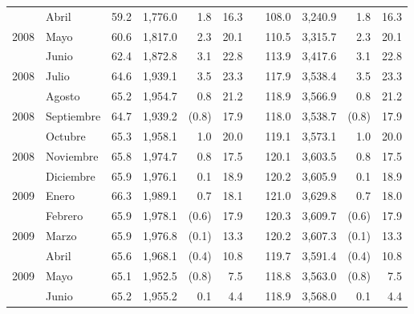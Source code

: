 \begin{center}
\begin{longtable}{llrrrrrrrrr}
		\rowcolor{color1!5!white}\multicolumn{1}{l}{	2008	}&	Abril	&	 59.2 	&	 1,776.0 	&	 1.8 	&	 16.3 	&  &	 108.0 	&	 3,240.9 	&	 1.8 	&	 16.3 	\\
		\multicolumn{1}{l}{	2008	}&	Mayo	&	 60.6 	&	 1,817.0 	&	 2.3 	&	 20.1 	&  &	 110.5 	&	 3,315.7 	&	 2.3 	&	 20.1 	\\
		\rowcolor{color1!5!white}\multicolumn{1}{l}{	2008	}&	Junio	&	 62.4 	&	 1,872.8 	&	 3.1 	&	 22.8 	&  &	 113.9 	&	 3,417.6 	&	 3.1 	&	 22.8 	\\
		\multicolumn{1}{l}{	2008	}&	Julio	&	 64.6 	&	 1,939.1 	&	 3.5 	&	 23.3 	&  &	 117.9 	&	 3,538.4 	&	 3.5 	&	 23.3 	\\
		\rowcolor{color1!5!white}\multicolumn{1}{l}{	2008	}&	Agosto	&	 65.2 	&	 1,954.7 	&	 0.8 	&	 21.2 	&  &	 118.9 	&	 3,566.9 	&	 0.8 	&	 21.2 	\\
		\multicolumn{1}{l}{	2008	}&	Septiembre	&	 64.7 	&	 1,939.2 	&	 (0.8)	&	 17.9 	&  &	 118.0 	&	 3,538.7 	&	 (0.8)	&	 17.9 	\\
		\rowcolor{color1!5!white}\multicolumn{1}{l}{	2008	}&	Octubre	&	 65.3 	&	 1,958.1 	&	 1.0 	&	 20.0 	&  &	 119.1 	&	 3,573.1 	&	 1.0 	&	 20.0 	\\
		\multicolumn{1}{l}{	2008	}&	Noviembre	&	 65.8 	&	 1,974.7 	&	 0.8 	&	 17.5 	&  &	 120.1 	&	 3,603.5 	&	 0.8 	&	 17.5 	\\
		\rowcolor{color1!5!white}\multicolumn{1}{l}{	2008	}&	Diciembre	&	 65.9 	&	 1,976.1 	&	 0.1 	&	 18.9 	&  &	 120.2 	&	 3,605.9 	&	 0.1 	&	 18.9 	\\
		\multicolumn{1}{l}{	2009	}&	Enero	&	 66.3 	&	 1,989.1 	&	 0.7 	&	 18.1 	&  &	 121.0 	&	 3,629.8 	&	 0.7 	&	 18.0 	\\
		\rowcolor{color1!5!white}\multicolumn{1}{l}{	2009	}&	Febrero	&	 65.9 	&	 1,978.1 	&	 (0.6)	&	 17.9 	&  &	 120.3 	&	 3,609.7 	&	 (0.6)	&	 17.9 	\\
		\multicolumn{1}{l}{	2009	}&	Marzo	&	 65.9 	&	 1,976.8 	&	 (0.1)	&	 13.3 	&  &	 120.2 	&	 3,607.3 	&	 (0.1)	&	 13.3 	\\
		\rowcolor{color1!5!white}\multicolumn{1}{l}{	2009	}&	Abril	&	 65.6 	&	 1,968.1 	&	 (0.4)	&	 10.8 	&  &	 119.7 	&	 3,591.4 	&	 (0.4)	&	 10.8 	\\
		\multicolumn{1}{l}{	2009	}&	Mayo	&	 65.1 	&	 1,952.5 	&	 (0.8)	&	 7.5 	&  &	 118.8 	&	 3,563.0 	&	 (0.8)	&	 7.5 	\\
		\rowcolor{color1!5!white}\multicolumn{1}{l}{	2009	}&	Junio	&	 65.2 	&	 1,955.2 	&	 0.1 	&	 4.4 	&  &	 118.9 	&	 3,568.0 	&	 0.1 	&	 4.4 	\\

\end{longtable}
\end{center}
